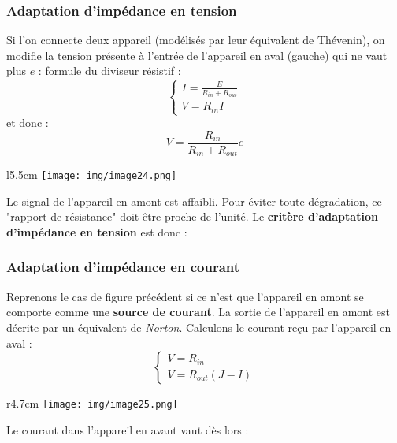 \subsubsection{Adaptation d'impédance en tension}
Si l'on connecte deux appareil (modélisés par leur équivalent de Thévenin), on modifie la tension présente à l'entrée de l'appareil en aval (gauche) qui ne vaut plus $e$ : formule du diviseur résistif :
\begin{equation}
	\left\{\begin{array}{l}
	I = \frac{E}{R_{in} + R_{out}}\\
	V = R_{in} I
	\end{array}\right.
\end{equation}
et donc : 
\begin{equation}
	V = \frac{R_{in}}{R_{in} + R_{out}}e
\end{equation}
\begin{wrapfigure}[5]{l}{5.5cm}
	\texttt{[image: img/image24.png]}
\end{wrapfigure}
Le signal de l'appareil en amont est affaibli. Pour éviter toute dégradation, ce "rapport de résistance" doit être proche de l'unité. Le \textbf{critère d'adaptation d'impédance en tension} est donc :\\


\subsubsection{Adaptation d'impédance en courant}
Reprenons le cas de figure précédent si ce n'est que l'appareil en amont se comporte comme une \textbf{source de courant}. La sortie de l'appareil en amont est décrite par un équivalent de \textit{Norton}. Calculons le courant reçu  par l'appareil en aval :
\begin{equation}
	\left\{\begin{array}{l}
	V = R_{in}\\
	V = R_{out}(J-I)
	\end{array}\right.
\end{equation}
\begin{wrapfigure}[6]{r}{4.7cm}
	\texttt{[image: img/image25.png]}
\end{wrapfigure}
Le courant dans l'appareil en avant vaut dès lors :

